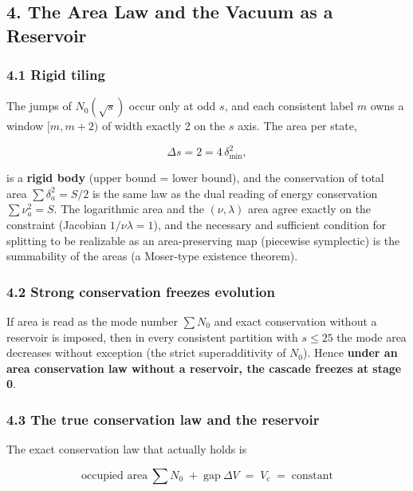 \documentclass[
]{ltjsarticle}
\begin{document}
\subsection{4. The Area Law and the Vacuum as a
Reservoir}\label{the-area-law-and-the-vacuum-as-a-reservoir}

\subsubsection{4.1 Rigid tiling}\label{rigid-tiling}

The jumps of \(N_0(\sqrt s)\) occur only at odd \(s\), and each
consistent label \(m\) owns a window \([m,m+2)\) of width exactly 2 on
the \(s\) axis. The area per state,

\[
\Delta s=2=4\,\delta_{\min}^2,
\]

is a \textbf{rigid body} (upper bound = lower bound), and the
conservation of total area \(\sum\delta_a^2=S/2\) is the same law as the
dual reading of energy conservation \(\sum\nu_a^2=S\). The logarithmic
area and the \((\nu,\lambda)\) area agree exactly on the constraint
(Jacobian \(1/\nu\lambda=1\)), and the necessary and sufficient
condition for splitting to be realizable as an area-preserving map
(piecewise symplectic) is the summability of the areas (a Moser-type
existence theorem).

\subsubsection{4.2 Strong conservation freezes
evolution}\label{strong-conservation-freezes-evolution}

If area is read as the mode number \(\sum N_0\) and exact conservation
without a reservoir is imposed, then in every consistent partition with
\(s\le25\) the mode area decreases without exception (the strict
superadditivity of \(N_0\)). Hence \textbf{under an area conservation
law without a reservoir, the cascade freezes at stage 0}.

\subsubsection{4.3 The true conservation law and the
reservoir}\label{the-true-conservation-law-and-the-reservoir}

The exact conservation law that actually holds is

\[
\text{occupied area}\ \textstyle\sum N_0\;+\;\text{gap}\ \Delta V\;=\;V_c\;=\;\text{constant}
\]
\end{document}
